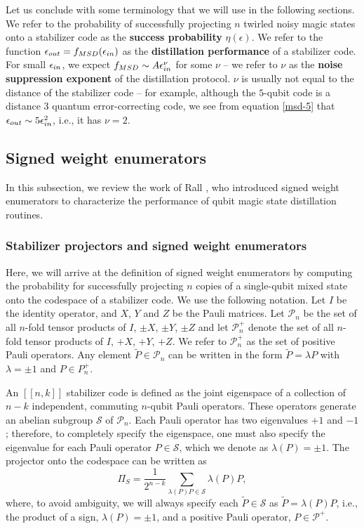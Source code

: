 \documentclass[11pt]{article}
\begin{document}
Let us conclude with some terminology that we will use in the following sections. We refer to the probability of successfully projecting $n$ twirled noisy magic states onto a stabilizer code as the \textbf{success probability} $\eta(\epsilon)$. We refer to the function $\epsilon_{\rm out}=f_{\rm MSD}(\epsilon_{\rm in})$ as the \textbf{distillation performance} of a stabilizer code. For small $\epsilon_{\rm in}$, we expect $f_{\rm MSD} \sim A \epsilon_{\rm in}^\nu$ for some $\nu$ -- we refer to $\nu$ as the \textbf{noise suppression exponent} of the distillation protocol. $\nu$ is usually not equal to the distance of the stabilizer code -- for example, although the $5$-qubit code is a distance $3$ quantum error-correcting code, we see from equation \eqref{msd-5} that  $\epsilon_{\rm out} \sim 5 \epsilon_{\rm in}^2$, i.e., it has $\nu=2$.

\subsection{Signed weight enumerators}
In this subsection, we review the work of Rall \cite{rall2017signed}, who introduced signed weight enumerators to characterize the performance of qubit magic state distillation routines.  

\subsubsection*{Stabilizer projectors and signed weight enumerators}
\label{sec:stabilizer-projection}

Here, we will arrive at the definition of signed weight enumerators by computing the probability for successfully projecting $n$ copies of a single-qubit mixed state onto the codespace of a stabilizer code. We use the following notation. Let $I$ be the identity operator, and $X$, $Y$ and $Z$ be the Pauli matrices. Let $\mathcal P_n$ be the set of all $n$-fold tensor products of $I$, $\pm X$, $\pm Y$, $\pm Z$ and let $\mathcal P_n^+$ denote the set of all $n$-fold tensor products of $I$, $+X$, $+Y$, $+Z$. We refer to $\mathcal P_n^+$ as the set of positive Pauli operators. Any element $\tilde{P}\in \mathcal P_n$ can be written in the form $\tilde{P}= \lambda P$ with $\lambda = \pm 1$ and $P \in P_n^+$.

An $[[n,k]]$ stabilizer code is defined as the joint eigenspace of a collection of $n-k$ independent, commuting $n$-qubit Pauli operators. These operators generate an abelian subgroup $\mathcal S$ of $\mathcal P_n$. Each Pauli operator has two eigenvalues $+1$ and $-1$; therefore, to completely specify the eigenspace, one must also specify the eigenvalue for each Pauli operator $P \in \mathcal S$, which we denote as $\lambda(P)=\pm 1$. The projector onto the codespace can be written as 
\begin{equation}
    \Pi_S = \frac{1}{2^{n-k}} \sum_{\lambda(P) P \in \mathcal S} \lambda(P)P,
\end{equation}
where, to avoid ambiguity, we will always specify  each $\tilde{P} \in \mathcal S$ as $\tilde{P}=\lambda(P)P$, i.e., the product of a sign, $\lambda(P)= \pm 1$, and a positive Pauli operator, $P \in \mathcal P^+$.
\end{document}
